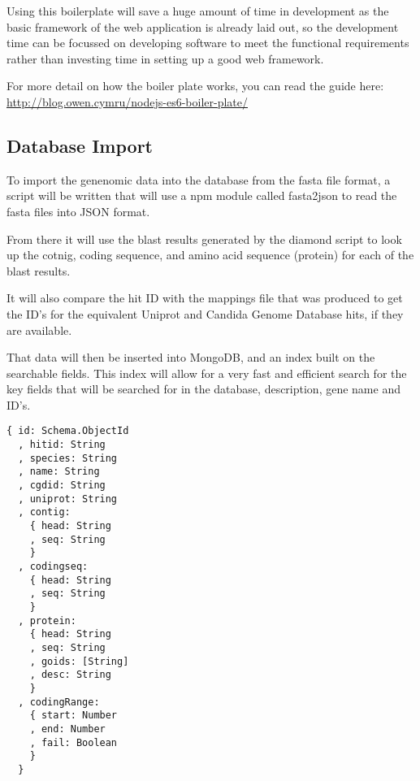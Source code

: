 Using this boilerplate will save a huge amount of time in development as the basic framework of the web application is already laid out, so the development time can be focussed on developing software to meet the functional requirements rather than investing time in setting up a good web framework. 

For more detail on how the boiler plate works, you can read the guide here: \url{http://blog.owen.cymru/nodejs-es6-boiler-plate/}

\subsection{Database Import}
To import the genenomic data into the database from the fasta file format, a script will be written that will use a npm module called fasta2json\cite{fasta2json} to read the fasta files into JSON format. 

From there it will use the blast results generated by the diamond script to look up the cotnig, coding sequence, and amino acid sequence (protein) for each of the blast results. 

It will also compare the hit ID with the mappings file that was produced to get the ID's for the equivalent Uniprot and Candida Genome Database hits, if they are available. 

That data will then be inserted into MongoDB, and an index built on the searchable fields. This index will allow for a very fast and efficient search for the key fields that will be searched for in the database, description, gene name and ID's.

\begin{lstlisting}[caption=The database schema that will represent the hit object]
  { id: Schema.ObjectId
  , hitid: String
  , species: String
  , name: String
  , cgdid: String
  , uniprot: String
  , contig: 
    { head: String
    , seq: String 
    }
  , codingseq: 
    { head: String
    , seq: String 
    }
  , protein: 
    { head: String
    , seq: String
    , goids: [String]
    , desc: String 
    }
  , codingRange: 
    { start: Number
    , end: Number
    , fail: Boolean 
    }
  }
\end{lstlisting}

    



